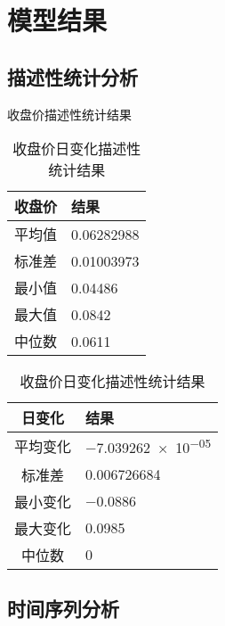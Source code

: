 
\chapter{模型结果}

\section{描述性统计分析}
\begin{table}[H]
  \centering
  \begin{minipage}{.45\linewidth}
    \centering
    \caption{收盘价描述性统计结果}
    \label{shoupan}
    \begin{tabular}{cl}
      \toprule
      收盘价   & 结果              \\
      \midrule
      平均值 & \num{0.06282988}        \\
      标准差 & \num{0.01003973}        \\
      最小值 & \num{0.04486}           \\
      最大值 & \num{0.0842}            \\
      中位数 & \num{0.0611}            \\
      \bottomrule
    \end{tabular}
  \end{minipage}%
  \hspace{0.05\linewidth}
  \begin{minipage}{.45\linewidth}
    \centering
    \caption{收盘价日变化描述性统计结果}
    \label{bianhua}
    \begin{tabular}{cl}
      \toprule
      日变化   & 结果              \\
      \midrule
      平均变化 & \num{-7.039262e-05}     \\
      标准差 & \num{0.006726684}       \\
      最小变化 & \num{-0.0886}           \\
      最大变化 & \num{0.0985}            \\
      中位数 & \num{0}                 \\
      \bottomrule
    \end{tabular}
  \end{minipage}
\end{table}

\section{时间序列分析}
